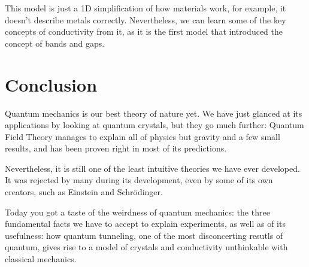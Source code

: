 \documentclass{article}
\begin{document}
This model is just a 1D simplification of how materials work, for example, it doesn't describe metals correctly. Nevertheless, we can learn some of the key concepts of conductivity from it, as it is the first model that introduced the concept of bands and gaps.

\section{Conclusion}

Quantum mechanics is our best theory of nature yet. We have just glanced at its applications by looking at quantum crystals, but they go much further: Quantum Field Theory manages to explain all of physics but gravity and a few small results, and has been proven right in most of its predictions.

Nevertheless, it is still one of the least intuitive theories we have ever developed. It was rejected by many during its development, even by some of its own creators, such as Einstein and Schrödinger.

Today you got a taste of the weirdness of quantum mechanics: the three fundamental facts we have to accept to explain experiments, as well as of its usefulness: how quantum tunneling, one of the most disconcerting resutls of quantum, gives rise to a model of crystals and conductivity unthinkable with classical mechanics.

\nocite{*}



\end{document}
